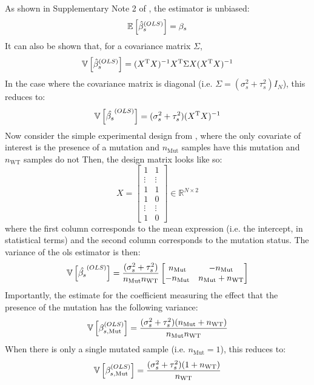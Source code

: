 As shown in Supplementary Note 2 of \cite[REF][]{pimentelDifferentialAnalysisRNAseq2017}, the estimator is unbiased:
%
\begin{equation}
  \mathbb{E} \left[  \hat{\beta}_s^{(OLS)}  \right] = \beta_s
\end{equation}
%
It can also be shown that, for a covariance matrix $\Sigma$,
%
\begin{equation}
  \mathbb{V} \left[  \hat{\beta}_s^{(OLS)}  \right] = (X^{\mathrm{T}} X)^{-1} X^{\mathrm{T}} \Sigma X (X^{\mathrm{T}} X)^{-1}
\end{equation}
%
In the case where the covariance matrix is diagonal (i.e. $\Sigma = (\sigma_s^2 + \tau_s^2)I_N$), this reduces to:
%
\begin{equation}
  \mathbb{V} \left[  \hat{\beta_s}^{(OLS)}  \right] = (\sigma_s^2 + \tau_s^2)(X^{\mathrm{T}} X)^{-1}
\end{equation}
%
Now consider the simple experimental design from , where the only covariate of interest is the presence of a mutation and $n_\mathrm{Mut}$ samples have this mutation and $n_\mathrm{WT}$ samples do not
Then, the design matrix looks like so:
%
\begin{equation}
  X = \begin{bmatrix}
    1      & 1      \\
    \vdots & \vdots \\
    1      & 1      \\
    1      & 0      \\
    \vdots & \vdots \\
    1      & 0
  \end{bmatrix}
  \in \mathbb{R}^{N \times 2}
\end{equation}
%
where the first column corresponds to the mean expression (i.e. the intercept, in statistical terms) and the second column corresponds to the mutation status.
The variance of the \gls{ols} estimator is then:
%
\begin{equation}
  \mathbb{V} \left[  \hat{\beta_s}^{(OLS)}  \right] = \frac{(\sigma_s^2 + \tau_s^2)}{n_\mathrm{Mut} n_\mathrm{WT}}
  \begin{bmatrix}
    n_\mathrm{Mut}   & -n_\mathrm{Mut}                \\
    - n_\mathrm{Mut} & n_\mathrm{Mut} + n_\mathrm{WT} \\
  \end{bmatrix}
\end{equation}
%
Importantly, the estimate for the coefficient measuring the effect that the presence of the mutation has the following variance:
%
\begin{equation}
  \mathbb{V} \left[  \beta_{s,\mathrm{Mut}}^{(OLS)}  \right] = \frac{(\sigma_s^2 + \tau_s^2)(n_\mathrm{Mut} + n_\mathrm{WT})}{n_\mathrm{Mut} n_\mathrm{WT}}
\end{equation}
%
When there is only a single mutated sample (i.e. $n_\mathrm{Mut} = 1$), this reduces to:
%
\begin{equation}
  \mathbb{V} \left[  \beta_{s,\mathrm{Mut}}^{(OLS)}  \right] = \frac{(\sigma_s^2 + \tau_s^2)(1 + n_\mathrm{WT})}{n_\mathrm{WT}}
\end{equation}

